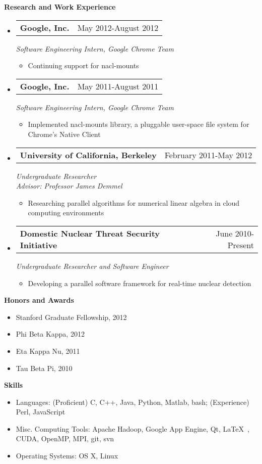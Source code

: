 \documentclass[letterpaper,11pt]{article}
\makeatletter
\newcommand{\resitem}[1]{\item #1 \vspace{-2pt}}
\newcommand{\desitem}[1]{\item #1 \vspace{-7pt}}
\newcommand{\resheading}[1]{{\large \colorbox{mygrey}{\begin{minipage}{\textwidth}{\textbf{#1 \vphantom{p\^{E}}}}\end{minipage}}}}
\newcommand{\expsubheading}[3]{
\begin{tabular*}{7.0in}{l@{\extracolsep{\fill}}r}
		\textbf{#1} & #2 \\
\end{tabular*}
\emph{#3}
\vspace{-6pt}
}
\makeatother
\begin{document}
\resheading{Research and Work Experience}
\begin{itemize}
\item
     \expsubheading{Google, Inc.}{May 2012-August 2012}{Software Engineering Intern, Google Chrome Team}
     \begin{itemize}
         \resitem{Continuing support for nacl-mounts}
     \end{itemize}
     
     \item
     \expsubheading{Google, Inc.}{May 2011-August 2011}{Software Engineering Intern, Google Chrome Team}
     \begin{itemize}
         \resitem{Implemented nacl-mounts library, a pluggable user-space file system for Chrome's Native Client}
     \end{itemize}

\item
   \expsubheading{University of California, Berkeley}{February 2011-May 2012}{Undergraduate Researcher \\
   Advisor: Professor James Demmel}
    \begin{itemize}
             \resitem{Researching parallel algorithms for numerical linear algebra in cloud computing environments}
     \end{itemize}
     
\item
    \expsubheading{Domestic Nuclear Threat Security Initiative}{June 2010-Present}{Undergraduate Researcher and Software Engineer}
    \begin{itemize}
         \resitem{Developing a parallel software framework for real-time nuclear detection}
     \end{itemize}    
     
\end{itemize}

\resheading{Honors and Awards}
\begin{itemize}
	\item{Stanford Graduate Fellowship, 2012}
	\item{Phi Beta Kappa, 2012}
	\item{Eta Kappa Nu, 2011}
	\item{Tau Beta Pi, 2010}
\end{itemize}

\vspace{0.1in}

\resheading{Skills}
\begin{itemize}
    \desitem{Languages:
                    (Proficient) C, C++, Java, Python, Matlab, bash; (Experience) Perl, JavaScript}
    \desitem{Misc. Computing Tools:
                     Apache Hadoop, Google App Engine, Qt, \LaTeX\ , CUDA, OpenMP, MPI, git, svn}
    \desitem{Operating Systems:
                     OS X, Linux}
\end{itemize}
\end{document}
